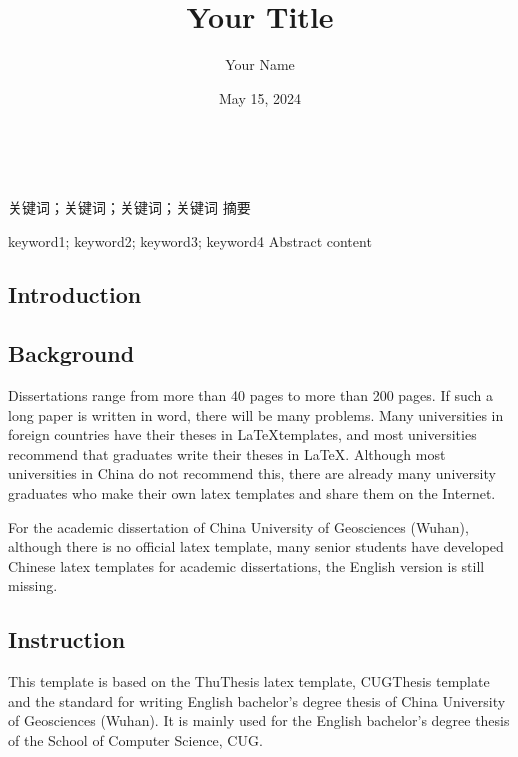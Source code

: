 \documentclass[twoside]{CUGCSthesis_EN}
\title{Your Title} %
\author{Your Name} %
\date{May 15, 2024} %
\begin{document}
	\maketitle
	\makestatement\

	\begin{cnabstract}{关键词；关键词；关键词；关键词}
 	\pagestyle{empyt}
		摘要
	\end{cnabstract}
	
	\begin{enabstract}{keyword1; keyword2; keyword3; keyword4}
		Abstract content
	\end{enabstract}
	
	\makeToc
	
	
	\begin{spacing}{2}
		\section{Introduction}
	\end{spacing}

	\subsection{Background}
	Dissertations range from more than 40 pages to more than 200 pages. If such a long paper is written in word, there will be many problems.
	Many universities in foreign countries have their theses in \LaTeX templates, and most universities recommend that graduates write their theses in \LaTeX.
	Although most universities in China do not recommend this, there are already many university graduates who make their own latex templates and 
	share them on the Internet.

	For the academic dissertation of China University of Geosciences (Wuhan), although there is no official latex template, many senior students 
	have developed Chinese latex templates for academic dissertations, the English version is still missing.

	\subsection{Instruction}
	This template is based on the ThuThesis latex template, CUGThesis template and the standard for writing English bachelor's degree thesis of China 
	University of Geosciences (Wuhan). It is mainly used for the English bachelor's degree thesis of the School of Computer Science, CUG.
\end{document}
